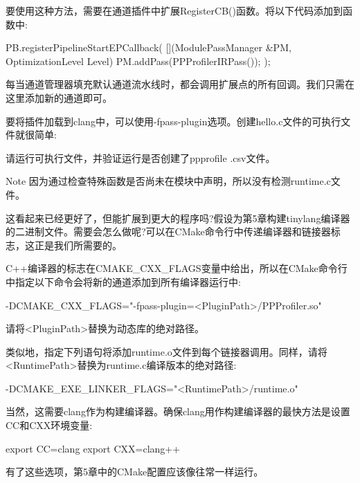 要使用这种方法，需要在通道插件中扩展RegisterCB()函数。将以下代码添加到函数中:

\begin{cpp}
PB.registerPipelineStartEPCallback(
    [](ModulePassManager &PM, OptimizationLevel Level) {
        PM.addPass(PPProfilerIRPass());
    });
\end{cpp}

每当通道管理器填充默认通道流水线时，都会调用扩展点的所有回调。我们只需在这里添加新的通道即可。

要将插件加载到clang中，可以使用-fpass-plugin选项。创建hello.c文件的可执行文件就很简单:


请运行可执行文件，并验证运行是否创建了ppprofile .csv文件。

\begin{myNotic}{Note}
因为通过检查特殊函数是否尚未在模块中声明，所以没有检测runtime.c文件。
\end{myNotic}

这看起来已经更好了，但能扩展到更大的程序吗?假设为第5章构建tinylang编译器的二进制文件。需要会怎么做呢?可以在CMake命令行中传递编译器和链接器标志，这正是我们所需要的。

C++编译器的标志在CMAKE\_CXX\_FLAGS变量中给出，所以在CMake命令行中指定以下命令会将新的通道添加到所有编译器运行中:

\begin{shell}
-DCMAKE_CXX_FLAGS="-fpass-plugin=<PluginPath>/PPProfiler.so"
\end{shell}

请将<PluginPath>替换为动态库的绝对路径。

类似地，指定下列语句将添加runtime.o文件到每个链接器调用。同样，请将<RuntimePath>替换为runtime.c编译版本的绝对路径:

\begin{shell}
-DCMAKE_EXE_LINKER_FLAGS="<RuntimePath>/runtime.o"
\end{shell}

当然，这需要clang作为构建编译器。确保clang用作构建编译器的最快方法是设置CC和CXX环境变量:

\begin{shell}
export CC=clang
export CXX=clang++
\end{shell}

有了这些选项，第5章中的CMake配置应该像往常一样运行。

